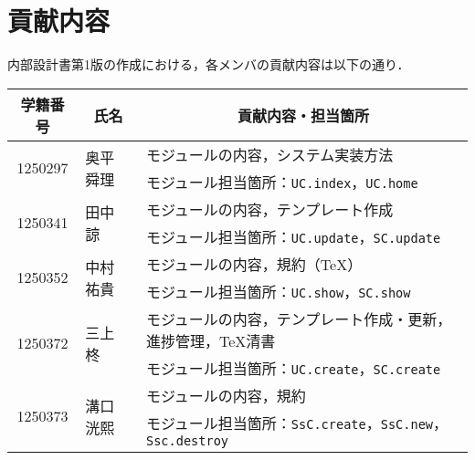 \chapter{貢献内容}
内部設計書第1版の作成における，各メンバの貢献内容は以下の通り．
\begin{table}[h]
    \centering
    \begin{tabularx}{\textwidth}{cll}
        \multicolumn{1}{c}{学籍番号} & \multicolumn{1}{c}{氏名} & \multicolumn{1}{c}{貢献内容・担当箇所}                                                     \\
        \hline
        \multirow{2}{*}{1250297} & \multirow{2}{*}{奥平 舜理} & モジュールの内容，システム実装方法                                                                 \\
                                 &                        & モジュール担当箇所：\texttt{UC.index}，\texttt{UC.home}                                      \\
        \hline
        \multirow{2}{*}{1250341} & \multirow{2}{*}{田中 諒}  & モジュールの内容，テンプレート作成                                                                 \\
                                 &                        & モジュール担当箇所：\texttt{UC.update}，\texttt{SC.update}                                   \\
        \hline
        \multirow{2}{*}{1250352} & \multirow{2}{*}{中村 祐貴} & モジュールの内容，規約（\TeX ）                                                                \\
                                 &                        & モジュール担当箇所：\texttt{UC.show}，\texttt{SC.show}                                       \\
        \hline
        \multirow{2}{*}{1250372} & \multirow{2}{*}{三上 柊}  & モジュールの内容，テンプレート作成・更新，進捗管理，\TeX 清書                                                 \\
                                 &                        & モジュール担当箇所：\texttt{UC.create}，\texttt{SC.create}                                   \\
        \hline
        \multirow{2}{*}{1250373} & \multirow{2}{*}{溝口 洸熙} & モジュールの内容，規約                                                                       \\
                                 &                        & モジュール担当箇所：\texttt{SsC.create}，\texttt{SsC.new}，\texttt{Ssc.destroy}               \\

\end{tabularx}
\end{table}
